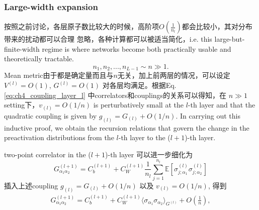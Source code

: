 \subsubsection{Large-width expansion}
按照之前讨论，各层原子数比较大的时候，高阶项$O(\frac{1}{n_l})$都会比较小，其对分布带来的扰动都可以合理
忽略，各种计算都可以被适当简化，i.e. this large-but-finite-width regime is where networks 
become both practically usable and theoretically tractable.
\begin{equation}
    n_1,n_2,...,n_{L-1} \sim n \gg 1.
\end{equation}
Mean metric由于都是确定量而且与$n$无关，加上前两层的情况，可以设定 $V^{(l)}=O(1)$, $G^{(l)}=O(1)$
对各层均满足。根据Eq. \ref{eq:ch4_coupling_layer_l} 中correlators和couplings的关系可以得知，在
$n\gg 1$ setting下，$v_{(l)}=O(1/n)$ is perturbatively small at the $l$-th layer and that 
the quadratic coupling is given by $g_{(l)}=G_{(l)}+O(1/n)$. In carrying out this inductive 
proof, we obtain the recursion relations that govern the change in the preactivation 
distributions from the $l$-th layer to the ($l + 1$)-th layer.

two-point correlator in the ($l+1$)-th layer 可以进一步细化为
\begin{equation}
    G_{\alpha_1\alpha_2}^{(l+1)} = C_b^{(l+1)} + C_W^{(l+1)}\frac{1}{n_l}
    \sum_{j=1}^{n_l}\mathbb{E}\left[\sigma_{j;\alpha_1}^{(l)}\sigma_{j;\alpha_2}^{(l)}
    \right]
\end{equation}
插入上述coupling $g_{(l)} = G_{(l)} + O(1/n)$ 以及 $v_{(l)} = O(1/n)$, 得到
\begin{equation}
    \begin{aligned}
    G_{\alpha_1\alpha_2}^{(l+1)} = C_b^{(l+1)} + C_W^{(l+1)}\langle \sigma_{\alpha_1}
    \sigma_{\alpha_2}\rangle_{G^{(l)}} + O\left(\frac{1}{n}\right),
    \end{aligned}
    \label{eq:ch4_2point_corr_layer_l}
\end{equation}


